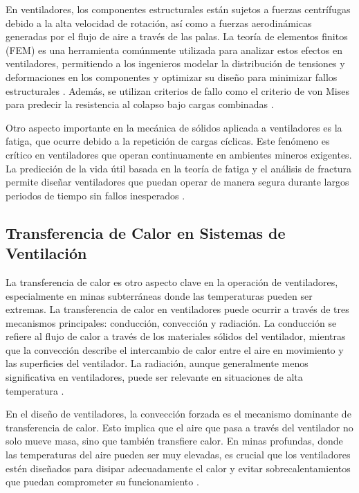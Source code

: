 En ventiladores, los componentes estructurales están sujetos a fuerzas centrífugas debido a la alta velocidad de rotación, así como a fuerzas aerodinámicas generadas por el flujo de aire a través de las palas. La teoría de elementos finitos (FEM) es una herramienta comúnmente utilizada para analizar estos efectos en ventiladores, permitiendo a los ingenieros modelar la distribución de tensiones y deformaciones en los componentes y optimizar su diseño para minimizar fallos estructurales \cite{zienkiewicz2005finite}. Además, se utilizan criterios de fallo como el criterio de von Mises para predecir la resistencia al colapso bajo cargas combinadas \cite{timoshenko1983history}.

Otro aspecto importante en la mecánica de sólidos aplicada a ventiladores es la fatiga, que ocurre debido a la repetición de cargas cíclicas. Este fenómeno es crítico en ventiladores que operan continuamente en ambientes mineros exigentes. La predicción de la vida útil basada en la teoría de fatiga y el análisis de fractura permite diseñar ventiladores que puedan operar de manera segura durante largos periodos de tiempo sin fallos inesperados \cite{fuchs2014fatigue}.

\subsection{Transferencia de Calor en Sistemas de Ventilación}

La transferencia de calor es otro aspecto clave en la operación de ventiladores, especialmente en minas subterráneas donde las temperaturas pueden ser extremas. La transferencia de calor en ventiladores puede ocurrir a través de tres mecanismos principales: conducción, convección y radiación. La conducción se refiere al flujo de calor a través de los materiales sólidos del ventilador, mientras que la convección describe el intercambio de calor entre el aire en movimiento y las superficies del ventilador. La radiación, aunque generalmente menos significativa en ventiladores, puede ser relevante en situaciones de alta temperatura \cite{incropera2007fundamentals}.

En el diseño de ventiladores, la convección forzada es el mecanismo dominante de transferencia de calor. Esto implica que el aire que pasa a través del ventilador no solo mueve masa, sino que también transfiere calor. En minas profundas, donde las temperaturas del aire pueden ser muy elevadas, es crucial que los ventiladores estén diseñados para disipar adecuadamente el calor y evitar sobrecalentamientos que puedan comprometer su funcionamiento \cite{kays2005convective}.

